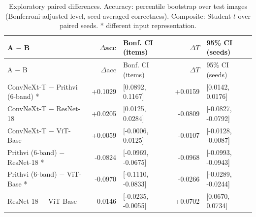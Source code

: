 \begin{longtable}{lrlrl}
\caption{Exploratory paired differences. Accuracy: percentile bootstrap over test images (Bonferroni-adjusted level, seed-averaged correctness). Composite: Student-$t$ over paired seeds. * different input representation.}\label{tab:paired}\\
\toprule A $-$ B & $\Delta$acc & Bonf. CI (items) & $\Delta T$ & 95\% CI (seeds) \\
\midrule\endfirsthead
\toprule A $-$ B & $\Delta$acc & Bonf. CI (items) & $\Delta T$ & 95\% CI (seeds) \\
\midrule\endhead
ConvNeXt-T $-$ Prithvi (6-band) * & +0.1029 & [0.0892, 0.1167] & +0.0159 & [0.0142, 0.0176] \\
ConvNeXt-T $-$ ResNet-18 & +0.0205 & [0.0125, 0.0284] & -0.0809 & [-0.0827, -0.0792] \\
ConvNeXt-T $-$ ViT-Base & +0.0059 & [-0.0006, 0.0125] & -0.0107 & [-0.0128, -0.0087] \\
Prithvi (6-band) $-$ ResNet-18 * & -0.0824 & [-0.0969, -0.0675] & -0.0968 & [-0.0993, -0.0943] \\
Prithvi (6-band) $-$ ViT-Base * & -0.0970 & [-0.1110, -0.0833] & -0.0266 & [-0.0289, -0.0244] \\
ResNet-18 $-$ ViT-Base & -0.0146 & [-0.0235, -0.0055] & +0.0702 & [0.0670, 0.0734] \\
\bottomrule
\end{longtable}

